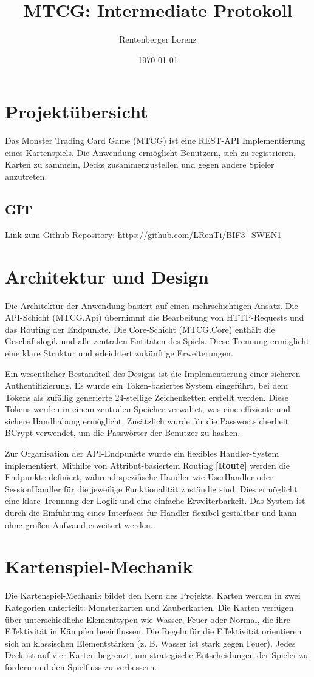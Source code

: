 \documentclass{article}
\title{MTCG: Intermediate Protokoll}
\author{Rentenberger Lorenz}
\date{\today}
\begin{document}
\maketitle

\section{Projektübersicht}
Das Monster Trading Card Game (MTCG) ist eine REST-API Implementierung eines Kartenspiels. Die Anwendung ermöglicht Benutzern, sich zu registrieren, Karten zu sammeln, Decks zusammenzustellen und gegen andere Spieler anzutreten.

\subsection{GIT}
Link zum Github-Repository: \url{https://github.com/LRenTi/BIF3_SWEN1}

\section{Architektur und Design}
Die Architektur der Anwendung basiert auf einen mehrschichtigen Ansatz. Die API-Schicht (MTCG.Api) übernimmt die Bearbeitung von HTTP-Requests und das Routing der Endpunkte. Die Core-Schicht (MTCG.Core) enthält die Geschäftslogik und alle zentralen Entitäten des Spiels. Diese Trennung ermöglicht eine klare Struktur und erleichtert zukünftige Erweiterungen.

Ein wesentlicher Bestandteil des Designs ist die Implementierung einer sicheren Authentifizierung. Es wurde ein Token-basiertes System eingeführt, bei dem Tokens als zufällig generierte 24-stellige Zeichenketten erstellt werden. Diese Tokens werden in einem zentralen Speicher verwaltet, was eine effiziente und sichere Handhabung ermöglicht. Zusätzlich wurde für die Passwortsicherheit BCrypt verwendet, um die Passwörter der Benutzer zu hashen.

Zur Organisation der API-Endpunkte wurde ein flexibles Handler-System implementiert. Mithilfe von Attribut-basiertem Routing \textbf{[Route]} werden die Endpunkte definiert, während spezifische Handler wie UserHandler oder SessionHandler für die jeweilige Funktionalität zuständig sind. Dies ermöglicht eine klare Trennung der Logik und eine einfache Erweiterbarkeit. Das System ist durch die Einführung eines Interfaces für Handler flexibel gestaltbar und kann ohne großen Aufwand erweitert werden.

\section{Kartenspiel-Mechanik}
Die Kartenspiel-Mechanik bildet den Kern des Projekts. Karten werden in zwei Kategorien unterteilt: Monsterkarten und Zauberkarten. Die Karten verfügen über unterschiedliche Elementtypen wie Wasser, Feuer oder Normal, die ihre Effektivität in Kämpfen beeinflussen. Die Regeln für die Effektivität orientieren sich an klassischen Elementstärken (z. B. Wasser ist stark gegen Feuer). Jedes Deck ist auf vier Karten begrenzt, um strategische Entscheidungen der Spieler zu fördern und den Spielfluss zu verbessern.
\end{document}
